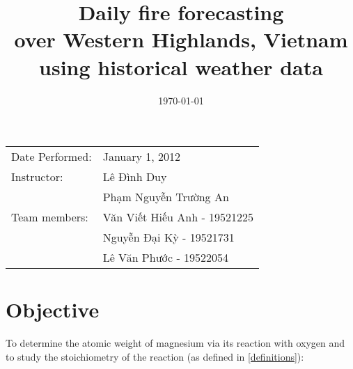 \documentclass{article}
\begin{document}
\title{Daily fire forecasting \\ over Western Highlands, Vietnam \\ using historical weather data} %
\date{\today} %
\maketitle %

\begin{center}
    \begin{tabular}{l l}
        Date Performed: & January 1, 2012              \\ %
        Instructor:     & Lê Đình Duy                  \\
                        & Phạm Nguyễn Trường An        \\

        Team members:   & Văn Viết Hiếu Anh - 19521225 \\
                        & Nguyễn Đại Kỳ - 19521731     \\
                        & Lê Văn Phước - 19522054      \\
    \end{tabular}
\end{center}




\section{Objective}

To determine the atomic weight of magnesium via its reaction with oxygen and to study the stoichiometry of the reaction (as defined in \ref{definitions}):

\begin{center}\end{center}

\end{document}
